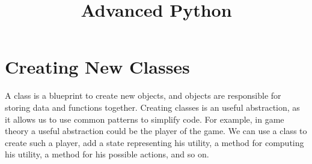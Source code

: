 \documentclass[12pt, a4paper]{article}
\date{}
\title{Advanced Python}
\begin{document}
\maketitle
\section{Creating New Classes}
\label{sec:org01c3ca4}
A class is a blueprint to create new objects, and objects are responsible for storing data and functions together.
Creating classes is an useful abstraction, as it allows us to use common patterns to simplify code.
For example, in game theory a useful abstraction could be the player of the game.
We can use a class to create such a player, add a state representing his utility, a method for computing his utility, a method for his possible actions, and so on.
\end{document}
